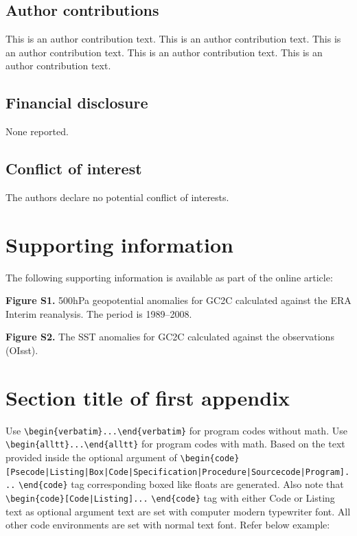 \documentclass[AMA,STIX1COL]{WileyNJD-v2}
\begin{document}
\subsection*{Author contributions}

This is an author contribution text. This is an author contribution text. This is an author contribution text. This is an author contribution text. This is an author contribution text. 

\subsection*{Financial disclosure}

None reported.

\subsection*{Conflict of interest}

The authors declare no potential conflict of interests.


\section*{Supporting information}

The following supporting information is available as part of the online article:

\noindent
\textbf{Figure S1.}
{500{\uns}hPa geopotential anomalies for GC2C calculated against the ERA Interim reanalysis. The period is 1989--2008.}

\noindent
\textbf{Figure S2.}
{The SST anomalies for GC2C calculated against the observations (OIsst).}


\appendix

\section{Section title of first appendix\label{app1}}

Use \verb+\begin{verbatim}...\end{verbatim}+ for program codes without math. Use \verb+\begin{alltt}...\end{alltt}+ for program codes with math. Based on the text provided inside the optional argument of \verb+\begin{code}[Psecode|Listing|Box|Code|+\hfill\break \verb+Specification|Procedure|Sourcecode|Program]...+ \verb+\end{code}+ tag corresponding boxed like floats are generated. Also note that \verb+\begin{code}[Code|Listing]...+ \verb+\end{code}+ tag with either Code or Listing text as optional argument text are set with computer modern typewriter font.  All other code environments are set with normal text font. Refer below example:
\end{document}
